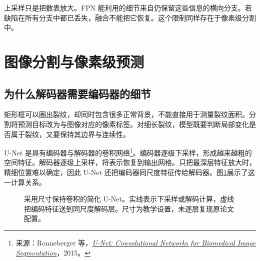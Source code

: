 上采样只是把数表放大。FPN 能利用的细节来自仍保留这些信息的横向分支。若缺陷在所有分支中都已丢失，融合不能把它恢复。这个限制同样存在于像素级分割中。

\section{图像分割与像素级预测}
\subsection{为什么解码器需要编码器的细节}
矩形框可以圈出裂纹，却同时包含很多正常背景，不能直接用于测量裂纹面积。分割将预测目标改为与图像对应的像素标签。对细长裂纹，模型既要判断局部变化是否属于裂纹，又要保持其边界与连续性。

U-Net 是具有编码器与解码器的卷积网络\footnote{来源：Ronneberger 等，\href{https://arxiv.org/abs/1505.04597}{\textit{U-Net: Convolutional Networks for Biomedical Image Segmentation}}，2015。}。编码器逐级下采样，形成越来越粗的空间特征。解码器逐级上采样，将表示恢复到输出网格。只把最深层特征放大时，精细位置难以确定，因此 U-Net 还把编码器同尺度特征传给解码器。图\ref{fig:vision-unet}展示了这一计算关系。

\begin{figure}[htbp]
\centering
{}
\caption{采用尺寸保持卷积的简化 U-Net。实线表示下采样或解码计算，虚线把编码特征送到同尺度解码层。尺寸为教学设置，未逐层复现原论文配置。}
\label{fig:vision-unet}
\end{figure}

